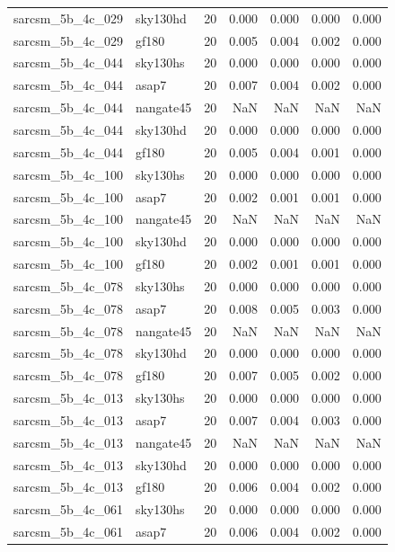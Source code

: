 \begin{tabular}{llrrrrr}
sarcsm\_5b\_4c\_029 & sky130hd & 20 & 0.000 & 0.000 & 0.000 & 0.000 \\
sarcsm\_5b\_4c\_029 & gf180 & 20 & 0.005 & 0.004 & 0.002 & 0.000 \\
sarcsm\_5b\_4c\_044 & sky130hs & 20 & 0.000 & 0.000 & 0.000 & 0.000 \\
sarcsm\_5b\_4c\_044 & asap7 & 20 & 0.007 & 0.004 & 0.002 & 0.000 \\
sarcsm\_5b\_4c\_044 & nangate45 & 20 & NaN & NaN & NaN & NaN \\
sarcsm\_5b\_4c\_044 & sky130hd & 20 & 0.000 & 0.000 & 0.000 & 0.000 \\
sarcsm\_5b\_4c\_044 & gf180 & 20 & 0.005 & 0.004 & 0.001 & 0.000 \\
sarcsm\_5b\_4c\_100 & sky130hs & 20 & 0.000 & 0.000 & 0.000 & 0.000 \\
sarcsm\_5b\_4c\_100 & asap7 & 20 & 0.002 & 0.001 & 0.001 & 0.000 \\
sarcsm\_5b\_4c\_100 & nangate45 & 20 & NaN & NaN & NaN & NaN \\
sarcsm\_5b\_4c\_100 & sky130hd & 20 & 0.000 & 0.000 & 0.000 & 0.000 \\
sarcsm\_5b\_4c\_100 & gf180 & 20 & 0.002 & 0.001 & 0.001 & 0.000 \\
sarcsm\_5b\_4c\_078 & sky130hs & 20 & 0.000 & 0.000 & 0.000 & 0.000 \\
sarcsm\_5b\_4c\_078 & asap7 & 20 & 0.008 & 0.005 & 0.003 & 0.000 \\
sarcsm\_5b\_4c\_078 & nangate45 & 20 & NaN & NaN & NaN & NaN \\
sarcsm\_5b\_4c\_078 & sky130hd & 20 & 0.000 & 0.000 & 0.000 & 0.000 \\
sarcsm\_5b\_4c\_078 & gf180 & 20 & 0.007 & 0.005 & 0.002 & 0.000 \\
sarcsm\_5b\_4c\_013 & sky130hs & 20 & 0.000 & 0.000 & 0.000 & 0.000 \\
sarcsm\_5b\_4c\_013 & asap7 & 20 & 0.007 & 0.004 & 0.003 & 0.000 \\
sarcsm\_5b\_4c\_013 & nangate45 & 20 & NaN & NaN & NaN & NaN \\
sarcsm\_5b\_4c\_013 & sky130hd & 20 & 0.000 & 0.000 & 0.000 & 0.000 \\
sarcsm\_5b\_4c\_013 & gf180 & 20 & 0.006 & 0.004 & 0.002 & 0.000 \\
sarcsm\_5b\_4c\_061 & sky130hs & 20 & 0.000 & 0.000 & 0.000 & 0.000 \\
sarcsm\_5b\_4c\_061 & asap7 & 20 & 0.006 & 0.004 & 0.002 & 0.000 \\

\end{tabular}
